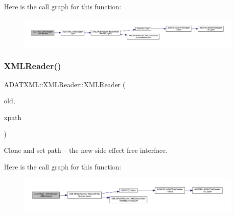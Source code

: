 Here is the call graph for this function\+:
\nopagebreak
\begin{figure}[H]
\begin{center}
\leavevmode
\includegraphics[width=350pt]{db/d3f/classADATXML_1_1XMLReader_a6829255c2dd448f4bf315f6fd0b380a1_cgraph}
\end{center}
\end{figure}
\mbox{\label{classADATXML_1_1XMLReader_aef69d83a0f47db461436fc2fd3bb7723}} 
\subsubsection{\texorpdfstring{XMLReader()}{XMLReader()}\hspace{0.1cm}{\footnotesize\ttfamily [10/10]}}
{\footnotesize\ttfamily A\+D\+A\+T\+X\+M\+L\+::\+X\+M\+L\+Reader\+::\+X\+M\+L\+Reader (\begin{DoxyParamCaption}\item[{\mbox{\hyperlink{classADATXML_1_1XMLReader}{X\+M\+L\+Reader}} \&}]{old,  }\item[{const std\+::string \&}]{xpath }\end{DoxyParamCaption})\hspace{0.3cm}{\ttfamily [inline]}}



Clone and set path -- the new side effect free interface. 

Here is the call graph for this function\+:
\nopagebreak
\begin{figure}[H]
\begin{center}
\leavevmode
\includegraphics[width=350pt]{db/d3f/classADATXML_1_1XMLReader_aef69d83a0f47db461436fc2fd3bb7723_cgraph}
\end{center}
\end{figure}
\mbox{\label{classADATXML_1_1XMLReader_a98c4936a3366f39443113290b7bd164a}} 
